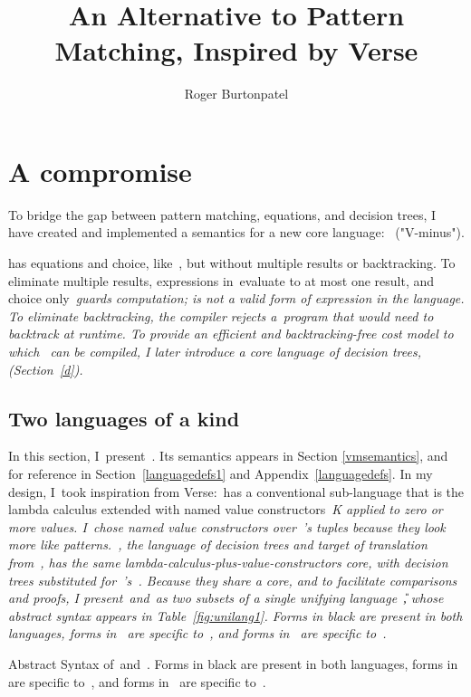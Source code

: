 \documentclass[manuscript,screen 12pt, nonacm]{acmart}
\title{An Alternative to Pattern Matching, Inspired by Verse}
\author{Roger Burtonpatel}
\affiliation{%
\institution{Tufts University}
\streetaddress{419 Boston Ave}
  \city{Medford}
  \state{Massachusetts}
  \country{USA}
  \postcode{02155}
  }
\begin{document}
  
\section{A compromise}
\label{compromise}
    
    To bridge the gap between pattern matching, equations, and decision trees, I
    have created and implemented a semantics for a new core language:~\VMinus
    ("V-minus"). 
    
    \VMinus has equations and choice, like~\VC, but without multiple results or
    backtracking. To eliminate multiple results, expressions in~\VMinus evaluate
    to at most one result, and choice only~\it{guards} computation; is not a
    valid form of expression in the language. To eliminate backtracking, the
    compiler rejects a~\VMinus program that would need to backtrack at runtime.
    To provide an efficient and backtracking-free cost model to which~\VMinus
    can be compiled, I later introduce a core language of decision trees,~\D
    (Section~\ref{d}). 

    \subsection{Two languages of a kind}
    
    In this section, I~present~\VMinus. Its semantics appears in Section
    \ref{vmsemantics}, and for reference in Section~\ref{languagedefs1} and
    Appendix~\ref{languagedefs}. In my design, I~took inspiration from
    Verse:~\VMinus has a conventional sub-language that is the lambda calculus
    extended with named value constructors~\it{K} applied to zero or more
    values. I~chose named value constructors over~\VC's tuples because they look
    more like patterns.~\D, the language of decision trees and target of
    translation from~\VMinus, has the same
    lambda-calculus-plus-value-constructors core, with decision trees
    substituted for~\VMinus's~\iffibf. Because they share a core, and to
    facilitate comparisons and proofs, I present~\VMinus and~\D as two subsets
    of a single unifying language~\U, whose abstract syntax appears in
    Table~\ref{fig:unilang1}. Forms in black are present in both languages,
    forms in~ are specific to~\VMinus, and forms in~ are
    specific to~\D. 

    \begin{table}[ht]
      \utable
      \caption{Abstract Syntax of~\VMinus and~\D. Forms in black are present in
              both languages, forms in~ are specific to~\VMinus, and
              forms in~ are specific to~\D.}
      \label{fig:unilang1}
    \end{table}
\end{document}
